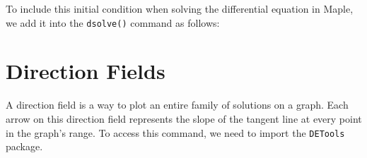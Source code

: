 To include this initial condition when solving the differential equation in Maple, we add it into the \texttt{dsolve()} command as follows:
\begin{maplegroup}
\begin{mapleinput}
\end{mapleinput}

\mapleresult
\begin{maplelatex}
\end{maplelatex}
\end{maplegroup}

\section{Direction Fields}
\label{sec:direction_fields_tutorial}


A direction field is a way to plot an entire family of solutions on a graph. Each arrow on this direction field represents the slope of the tangent line at every point in the graph's range. To access this command, we need to import the \texttt{DETools} package.

\begin{maplegroup}
\begin{mapleinput}
\end{mapleinput}
\end{maplegroup}


\begin{maplegroup}
\begin{mapleinput}
\end{mapleinput}
\mapleresult
{}
\begin{maplelatex}
\end{maplelatex}
\end{maplegroup}


